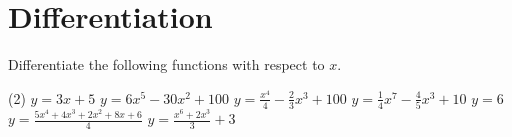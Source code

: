 \section{Differentiation}

\begin{exercise}
    Differentiate the following functions with respect to $x$.
    \begin{tasks}[after-item-skip=100pt,after-skip=120pt](2)
        \task $ y=3x+5 $ 
        \task $ y=6x^5-30x^2+100 $
        \task $ y=\displaystyle \frac{x^4}{4} -  \displaystyle \frac{2}{3}x^3+100 $
        \task $ y=\displaystyle \frac{1}{4}x^7 - \displaystyle \frac{4}{5}x^3+10 $
        \task $ y=6 $
        \task $ y=\displaystyle \frac{5x^4+4x^3+2x^2+8x+6}{4} $
        \task $ y=\displaystyle \frac{x^6+2x^3}{3} + 3 $
    \end{tasks}
\end{exercise}

